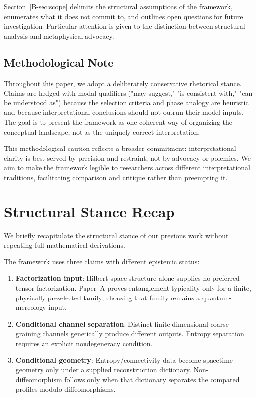 \documentclass[12pt,a4paper,openany]{book}
\begin{document}
Section~\ref{B-sec:scope} delimits the structural assumptions of the framework, enumerates what it does not commit to, and outlines open questions for future investigation. Particular attention is given to the distinction between structural analysis and metaphysical advocacy.

\subsection{Methodological Note}

Throughout this paper, we adopt a deliberately conservative rhetorical stance. Claims are hedged with modal qualifiers ("may suggest," "is consistent with," "can be understood as") because the selection criteria and phase analogy are heuristic and because interpretational conclusions should not outrun their model inputs. The goal is to present the framework as one coherent way of organizing the conceptual landscape, not as the uniquely correct interpretation.

This methodological caution reflects a broader commitment: interpretational clarity is best served by precision and restraint, not by advocacy or polemics. We aim to make the framework legible to researchers across different interpretational traditions, facilitating comparison and critique rather than preempting it.

\section{Structural Stance Recap}
\label{B-sec:stance}

We briefly recapitulate the structural stance of our previous work without repeating full mathematical derivations.

The framework uses three claims with different epistemic status:
\begin{enumerate}
\item \textbf{Factorization input}: Hilbert-space structure alone supplies no preferred tensor factorization.  Paper~A proves entanglement typicality only for a finite, physically preselected family; choosing that family remains a quantum-mereology input.

\item \textbf{Conditional channel separation}: Distinct finite-dimensional coarse-graining channels generically produce different outputs.  Entropy separation requires an explicit nondegeneracy condition.

\item \textbf{Conditional geometry}: Entropy/connectivity data become spacetime geometry only under a supplied reconstruction dictionary.  Non-diffeomorphism follows only when that dictionary separates the compared profiles modulo diffeomorphisms.
\end{enumerate}
\end{document}
